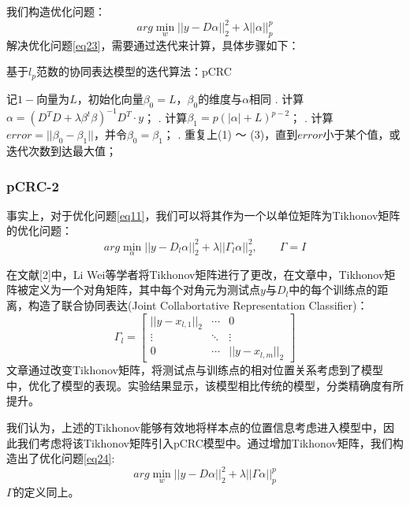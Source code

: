 \documentclass[12pt,a4paper]{article}
\begin{document}
我们构造优化问题：
\begin{equation}
\label{eq23}
arg \min_{w} ||y - D\alpha||_{2}^{2} + \lambda ||\alpha||_{p}^{p}
\end{equation}
解决优化问题\eqref{eq23}，需要通过迭代来计算，具体步骤如下：
\begin{algorithm}[H] 
	\caption{基于$l_{p}$范数的协同表达模型的迭代算法：pCRC}  
	\label{alg:pCRC-1}  
	\begin{algorithmic}
		\STATE 记$1-$向量为$L$，初始化向量$\beta_{0} = L$，$\beta_{0}$的维度与$\alpha$相同
		. 计算$\alpha = (D^{T}D + \lambda \beta^{t}\beta)^{-1}D^{T} \cdot y$；   
		. 计算$\beta_{1} = p(|\alpha| + L)^{p - 2}$；
		. 计算$error = ||\beta_{0} - \beta_{1}||$，并令$\beta_{0} = \beta_{1}$；
		. 重复上(1) ～ (3)，直到$error$小于某个值，或迭代次数到达最大值；
	\end{algorithmic}  
\end{algorithm}  

\subsubsection{pCRC-2}
事实上，对于优化问题\eqref{eq11}，我们可以将其作为一个以单位矩阵为Tikhonov矩阵的优化问题：
\begin{equation*}
arg\min_{\alpha} ||y - D_{l}\alpha||_{2}^{2} + \lambda||\Gamma_{l} \alpha||_{2}^{2}, \qquad \Gamma = I
\end{equation*}

在文献[2]中，Li Wei等学者将Tikhonov矩阵进行了更改，在文章中，Tikhonov矩阵被定义为一个对角矩阵，其中每个对角元为测试点$y$与$D_{l}$中的每个训练点的距离，构造了联合协同表达(Joint Collabortative Representation Classifier)：
\begin{equation}
\Gamma_{l} = 
\left[\begin{array}{ccc}
||y - x_{l, 1}||_{2} & \cdots & 0 \\
\vdots & \ddots & \vdots \\
0 & \cdots & ||y - x_{l, m}||_{2}
\end{array}\right]
\end{equation}
文章通过改变Tikhonov矩阵，将测试点与训练点的相对位置关系考虑到了模型中，优化了模型的表现。实验结果显示，该模型相比传统的模型，分类精确度有所提升。

我们认为，上述的Tikhonov能够有效地将样本点的位置信息考虑进入模型中，因此我们考虑将该Tikhonov矩阵引入pCRC模型中。通过增加Tikhonov矩阵，我们构造出了优化问题\eqref{eq24}:
\begin{equation}
\label{eq24}
arg \min_{w} ||y - D\alpha||_{2}^{2} + \lambda ||\Gamma \alpha||_{p}^{p}
\end{equation}
$\Gamma$的定义同上。
\end{document}

